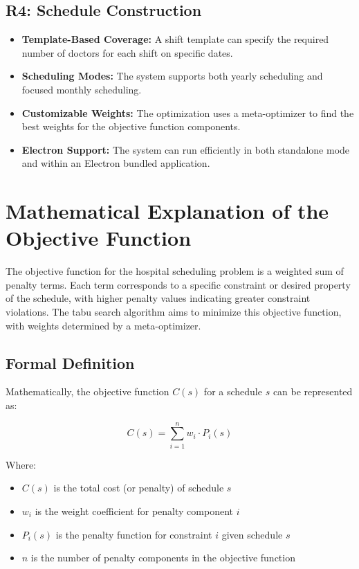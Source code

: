 \documentclass[12pt]{article}
\begin{document}
\subsection*{R4: Schedule Construction}

\begin{itemize}
    \item \textbf{Template-Based Coverage:} A shift template can specify the required number of doctors for each shift on specific dates.
    
    \item \textbf{Scheduling Modes:} The system supports both yearly scheduling and focused monthly scheduling.
    
    \item \textbf{Customizable Weights:} The optimization uses a meta-optimizer to find the best weights for the objective function components.
    
    \item \textbf{Electron Support:} The system can run efficiently in both standalone mode and within an Electron bundled application.
\end{itemize}

\newpage
\section{Mathematical Explanation of the Objective Function}

The objective function for the hospital scheduling problem is a weighted sum of penalty terms. Each term corresponds to a specific constraint or desired property of the schedule, with higher penalty values indicating greater constraint violations. The tabu search algorithm aims to minimize this objective function, with weights determined by a meta-optimizer.

\subsection{Formal Definition}

Mathematically, the objective function $C(s)$ for a schedule $s$ can be represented as:

\begin{equation}
C(s) = \sum_{i=1}^{n} w_i \cdot P_i(s)
\end{equation}

Where:
\begin{itemize}
    \item $C(s)$ is the total cost (or penalty) of schedule $s$
    \item $w_i$ is the weight coefficient for penalty component $i$
    \item $P_i(s)$ is the penalty function for constraint $i$ given schedule $s$
    \item $n$ is the number of penalty components in the objective function
\end{itemize}
\end{document}
